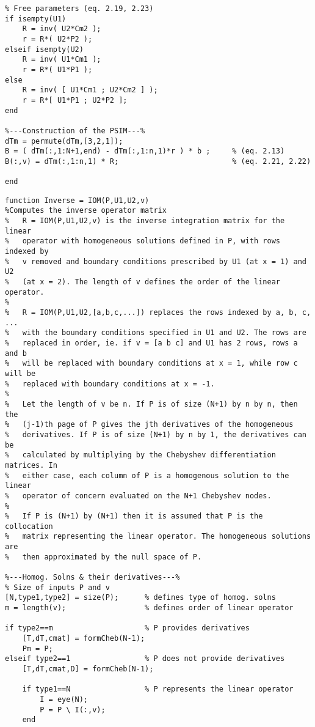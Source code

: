 \documentclass{sfuthesis}
\begin{document}
\begin{appendices}
\begin{verbatim}
% Free parameters (eq. 2.19, 2.23)
if isempty(U1)
    R = inv( U2*Cm2 );
    r = R*( U2*P2 );
elseif isempty(U2)
    R = inv( U1*Cm1 );
    r = R*( U1*P1 );
else
    R = inv( [ U1*Cm1 ; U2*Cm2 ] );
    r = R*[ U1*P1 ; U2*P2 ];
end

%---Construction of the PSIM---%
dTm = permute(dTm,[3,2,1]);
B = ( dTm(:,1:N+1,end) - dTm(:,1:n,1)*r ) * b ;     % (eq. 2.13)
B(:,v) = dTm(:,1:n,1) * R;                          % (eq. 2.21, 2.22)

end
\end{verbatim}

\newpage

\begin{verbatim}
function Inverse = IOM(P,U1,U2,v)
%Computes the inverse operator matrix
%   R = IOM(P,U1,U2,v) is the inverse integration matrix for the linear
%   operator with homogeneous solutions defined in P, with rows indexed by
%   v removed and boundary conditions prescribed by U1 (at x = 1) and U2
%   (at x = 2). The length of v defines the order of the linear operator.
%
%   R = IOM(P,U1,U2,[a,b,c,...]) replaces the rows indexed by a, b, c, ...
%   with the boundary conditions specified in U1 and U2. The rows are
%   replaced in order, ie. if v = [a b c] and U1 has 2 rows, rows a and b
%   will be replaced with boundary conditions at x = 1, while row c will be
%   replaced with boundary conditions at x = -1.
%
%   Let the length of v be n. If P is of size (N+1) by n by n, then the
%   (j-1)th page of P gives the jth derivatives of the homogeneous
%   derivatives. If P is of size (N+1) by n by 1, the derivatives can be
%   calculated by multiplying by the Chebyshev differentiation matrices. In
%   either case, each column of P is a homogenous solution to the linear
%   operator of concern evaluated on the N+1 Chebyshev nodes.
%
%   If P is (N+1) by (N+1) then it is assumed that P is the collocation
%   matrix representing the linear operator. The homogeneous solutions are
%   then approximated by the null space of P.

%---Homog. Solns & their derivatives---%
% Size of inputs P and v
[N,type1,type2] = size(P);      % defines type of homog. solns
m = length(v);                  % defines order of linear operator

if type2==m                     % P provides derivatives
    [T,dT,cmat] = formCheb(N-1);
    Pm = P;
elseif type2==1                 % P does not provide derivatives
    [T,dT,cmat,D] = formCheb(N-1);
    
    if type1==N                 % P represents the linear operator
        I = eye(N);
        P = P \ I(:,v);
    end
    

\end{verbatim}
\end{appendices}
\end{document}

